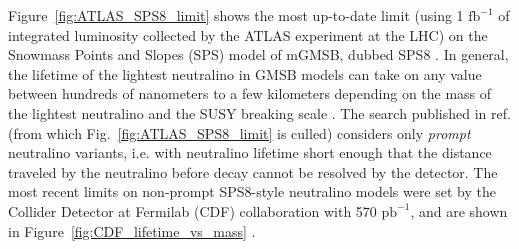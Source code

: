 \documentclass[dissertation.tex]{subfiles}
\begin{document}

\marginpar{\textcolor{blue}{Removed CMS Moriond result}}Figure~\ref{fig:ATLAS_SPS8_limit} shows the most up-to-date limit (using 1 $\mbox{fb}^{-1}$ of integrated luminosity collected by the ATLAS experiment \cite{ATLAS} at the LHC) on the Snowmass Points and Slopes (SPS) model of mGMSB, dubbed SPS8 \cite{SPS}.  In general, the lifetime of the lightest neutralino in GMSB models can take on any value between hundreds of nanometers to a few kilometers depending on the mass of the lightest neutralino and the SUSY breaking scale \cite{SUSY_primer}.  The search published in ref. \cite{ATLAS_GMSB_1fb-1} (from which Fig.~\ref{fig:ATLAS_SPS8_limit} is culled) considers only \textit{prompt} neutralino variants, i.e. with neutralino lifetime short enough that the distance traveled by the neutralino before decay cannot be resolved by the detector.  The most recent limits on non-prompt SPS8-style neutralino models were set by the Collider Detector at Fermilab (CDF) collaboration with 570 $\mbox{pb}^{-1}$, and are shown in Figure~\ref{fig:CDF_lifetime_vs_mass} \cite{CDF_2010_GMSB_paper}.
\end{document}
